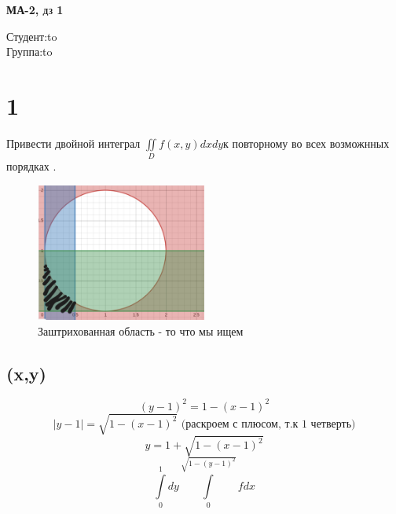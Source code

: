 
	
	\begin{titlepage}
		
		
		\begin{center}
			\textsc{\textbf{МА-2, дз 1}}
		\end{center}
		
		\vspace{6em}
		
		
		
		\newbox{\lbox}
		\newlength{\maxl}
		\setlength{\maxl}{\wd\lbox}
		\hfill\parbox{11cm}{
			\hspace*{5cm}\hspace*{-5cm}Студент:\hfill\hbox to\\
			\hspace*{5cm}\hspace*{-5cm}Группа:\hfill\hbox to\\
		}
		
		
		
	\end{titlepage}
	\section*{1}
Привести двойной интеграл $\iint\limits_{D}f(x,y)dxdy$к повторному во всех возможнных порядках .
\begin{figure}[h]
	\centering
	\includegraphics[width=0.5\textwidth]{Screenshot from 2024-09-23 11-34-24}
	\caption{Заштрихованная область - то что мы ищем}
	\label{fig:example}
\end{figure}

 \subsection*{(x,y)}
 		$$(y-1)^2 = 1-(x-1)^2$$
 		$$|y-1| =\sqrt{1-(x-1)^2} \text{ (раскроем с плюсом, т.к 1 четверть)}$$
 		$$y = 1+  \sqrt{1-(x-1)^2}$$
 		$$\int\limits_0^1dy\int\limits_{0}^{\sqrt{1-(y-1)^2}}fdx$$
 		
